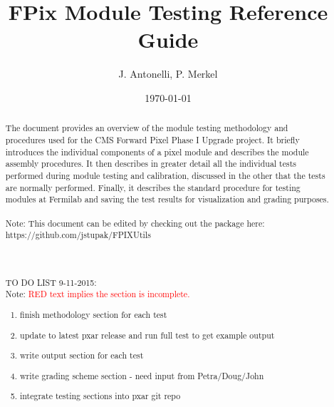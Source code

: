 \documentclass{scrartcl}
\title{FPix Module Testing Reference Guide} %
\author{
J. Antonelli, 
P. Merkel
} %
\date{\today} %
\begin{document}
\maketitle %


\begin{abstract}
The document provides an overview of the module testing methodology and procedures used for the CMS Forward Pixel Phase I Upgrade project. 
It briefly introduces the individual components of a pixel module and describes the module assembly procedures.
It then describes in greater detail all the individual tests performed during module testing and calibration, discussed in the other that the tests are normally performed. 
Finally, it describes the standard procedure for testing modules at Fermilab and saving the test results for visualization and grading purposes.
\\\\
Note: This document can be edited by checking out the package here: 
\\
https://github.com/jstupak/FPIXUtils
\\\\\\\\
TO DO LIST 9-11-2015:
\\
Note: \textcolor{red}{RED text implies the section is incomplete.}
\begin{enumerate}
\item finish methodology section for each test
\item update to latest pxar release and run full test to get example output
\item write output section for each test
\item write grading scheme section - need input from Petra/Doug/John
\item integrate testing sections into pxar git repo
\end{enumerate}

\end{abstract}

\newpage
\tableofcontents

\newpage









%  
\end{document}
